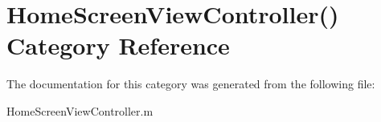 \hypertarget{category_home_screen_view_controller_07_08}{\section{Home\+Screen\+View\+Controller() Category Reference}
\label{category_home_screen_view_controller_07_08}
}


The documentation for this category was generated from the following file\+:\begin{DoxyCompactItemize}
\item 
Home\+Screen\+View\+Controller.\+m\end{DoxyCompactItemize}
